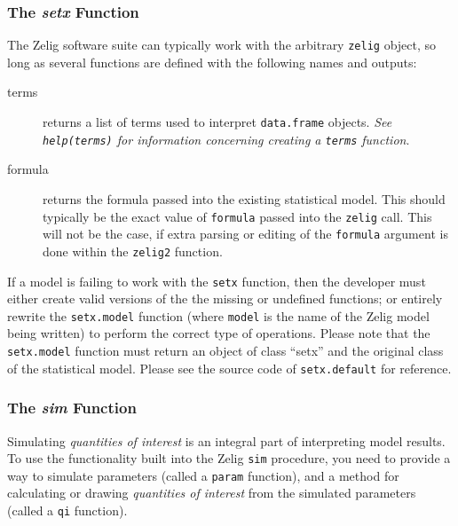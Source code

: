 %
\subsubsection{The \emph{setx} Function}
The Zelig software suite can typically work with the arbitrary {\tt zelig} object, so long as several functions are defined with the following names and outputs:

\begin{description}
	\item[terms]{returns a list of terms used to interpret {\tt data.frame} objects.  \emph{See {\tt help(terms)} for information concerning creating a {\tt terms} function}.}
	\item[formula]{returns the formula passed into the existing statistical model.  This should typically be the exact value of {\tt formula} passed into the {\tt zelig} call.  This will not be the case, if extra parsing or editing of the {\tt formula} argument is done within the {\tt zelig2} function.}
\end{description}

If a model is failing to work with the {\tt setx} function, then the developer must either create valid versions of the the missing or undefined functions; or entirely rewrite the {\tt setx.model} function (where {\tt model} is the name of the Zelig model being written) to perform the correct type of operations.  Please note that the {\tt setx.model} function must return an object of class ``setx'' and the original class of the statistical model.  Please see the source code of {\tt setx.default} for reference.

\subsubsection{The \emph{sim} Function}

Simulating \emph{quantities of interest} is an integral part of interpreting model results. To use the functionality built into the Zelig {\tt sim} procedure, you need to provide a way to simulate parameters (called a {\tt param} function), and a method for calculating or drawing \emph{quantities of interest} from the simulated parameters (called a {\tt qi} function).


